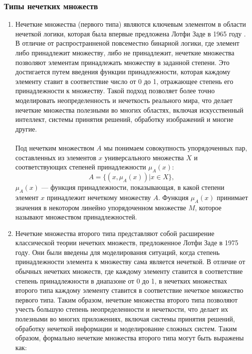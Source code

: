 \documentclass{article}
\begin{document}
    \subsubsection{Типы нечетких множеств}
    \begin{enumerate}
        \item Нечеткие множества (первого типа) являются ключевым элементом в области нечеткой логики, которая была впервые предложена Лотфи Заде в 1965 году \cite{litlink21}. В отличие от распространненой повсеместно бинарной логики, где элемент либо принадлежит множеству, либо не принадлежит, нечеткие множества позволяют элементам принадлежать множеству в заданной степени. Это достигается путем введения функции принадлежности, которая каждому элементу ставит в соответствие число от 0 до 1, отражающее степень его принадлежности к множеству. Такой подход позволяет более точно моделировать неопределенность и нечеткость реального мира, что делает нечеткие множества полезными во многих областях, включая искусственный интеллект, системы принятия решений, обработку изображений и многие другие.\\
        ~\\
        Под нечетким множеством $A$ мы понимаем совокупность упорядоченных пар, составленных из элементов $x$ универсального множества $X$ и соответствующих степеней принадлежности $\mu_A(x)$:\\
        $$A=\{(x, \mu_A(x)) | x \in X\},$$
        $\mu_A(x)$ — функция принадлежности, показывающая, в какой степени элемент $x$ принадлежит нечеткому множеству $A$. Функция $\mu_A(x)$ принимает значения в некотором линейно упорядоченном множестве $M$, которое называют множеством принадлежностей.
        \item Нечеткие множества второго типа представляют собой расширение классической теории нечетких множеств, предложенное Лотфи Заде в 1975 году. Они были введены для моделирования ситуаций, когда степень принадлежности элемента к множеству сама является нечеткой. В отличие от обычных нечетких множеств, где каждому элементу ставится в соответствие степень принадлежности в диапазоне от 0 до 1, в нечетких множествах второго типа каждому элементу ставится в соответствие нечеткое множество первого типа. Таким образом, нечеткие множества второго типа позволяют учесть большую степень неопределенности и нечеткости, что делает их полезными во многих приложениях, включая системы принятия решений, обработку нечеткой информации и моделирование сложных систем. Таким образом, формально нечеткие множества второго типа могут быть выражены как:

\end{enumerate}
\end{document}

